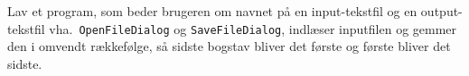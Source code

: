 Lav et program, som beder brugeren om navnet på en input-tekstfil og
en output-tekstfil vha.\ \lstinline{OpenFileDialog} og
\lstinline{SaveFileDialog}, indlæser inputfilen og gemmer den i
omvendt rækkefølge, så sidste bogstav bliver det første og første
bliver det sidste.
